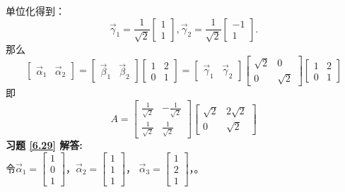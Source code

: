 单位化得到：
\begin{equation*}
\vec{\gamma}_1=\frac{1}{\sqrt{2}}\begin{bmatrix}1\\1\end{bmatrix},
\vec{\gamma}_2=\frac{1}{\sqrt{2}}\begin{bmatrix}-1\\1\end{bmatrix}.
\end{equation*}
那么
\begin{equation*}
\begin{bmatrix}\vec{\alpha}_1&\vec{\alpha}_2\end{bmatrix}=
\begin{bmatrix}\vec{\beta}_1&\vec{\beta}_2\end{bmatrix}\begin{bmatrix}1&2\\0&1\end{bmatrix}
=\begin{bmatrix}\vec{\gamma}_1&\vec{\gamma}_2\end{bmatrix}\begin{bmatrix}\sqrt{2}&0\\0&\sqrt{2}\end{bmatrix}
\begin{bmatrix}1&2\\0&1\end{bmatrix}
\end{equation*}
即
\begin{equation*}
A=\begin{bmatrix}\frac{1}{\sqrt{2}}&-\frac{1}{\sqrt{2}}\\ \frac{1}{\sqrt{2}}&\frac{1}{\sqrt{2}}\end{bmatrix}
  \begin{bmatrix}\sqrt{2}&2\sqrt{2}\\0&\sqrt{2}\end{bmatrix}
\end{equation*}
\textbf{习题 \ref{6.29} 解答:}\\
令$\vec{\alpha}_1=\begin{bmatrix}1\\0\\1\end{bmatrix}$，$\vec{\alpha}_2=\begin{bmatrix}1\\1\\1\end{bmatrix}$，
$\vec{\alpha}_3=\begin{bmatrix}1\\2\\1\end{bmatrix}$，。
